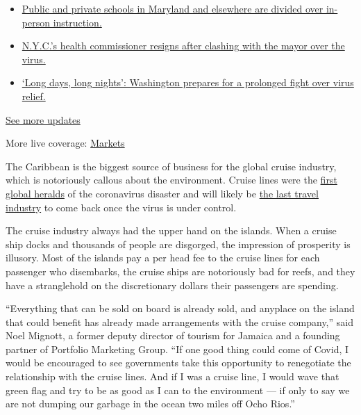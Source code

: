 \begin{itemize}
\tightlist
\item
  \href{https://www.nytimes.com/2020/08/04/world/coronavirus-cases.html?action=click\&pgtype=Article\&state=default\&region=MAIN_CONTENT_1\&context=storylines_live_updates\#link-4825b93}{Public
  and private schools in Maryland and elsewhere are divided over
  in-person instruction.}
\item
  \href{https://www.nytimes.com/2020/08/04/world/coronavirus-cases.html?action=click\&pgtype=Article\&state=default\&region=MAIN_CONTENT_1\&context=storylines_live_updates\#link-4d1eafa8}{N.Y.C.'s
  health commissioner resigns after clashing with the mayor over the
  virus.}
\item
  \href{https://www.nytimes.com/2020/08/04/world/coronavirus-cases.html?action=click\&pgtype=Article\&state=default\&region=MAIN_CONTENT_1\&context=storylines_live_updates\#link-6b644638}{`Long
  days, long nights': Washington prepares for a prolonged fight over
  virus relief.}
\end{itemize}

\href{https://www.nytimes.com/2020/08/04/world/coronavirus-cases.html?action=click\&pgtype=Article\&state=default\&region=MAIN_CONTENT_1\&context=storylines_live_updates}{See
more updates}

More live coverage:
\href{https://www.nytimes.com/live/2020/08/04/business/stock-market-today-coronavirus?action=click\&pgtype=Article\&state=default\&region=MAIN_CONTENT_1\&context=storylines_live_updates}{Markets}

The Caribbean is the biggest source of business for the global cruise
industry, which is notoriously callous about the environment. Cruise
lines were the
\href{https://www.nytimes.com/2020/03/19/travel/coronavirus-cruise-costa-luminosa.html}{first
global heralds} of the coronavirus disaster and will likely be
\href{https://www.nytimes.com/2020/06/26/travel/coronavirus-cruises-reopening.html}{the
last travel industry} to come back once the virus is under control.

The cruise industry always had the upper hand on the islands. When a
cruise ship docks and thousands of people are disgorged, the impression
of prosperity is illusory. Most of the islands pay a per head fee to the
cruise lines for each passenger who disembarks, the cruise ships are
notoriously bad for reefs, and they have a stranglehold on the
discretionary dollars their passengers are spending.

``Everything that can be sold on board is already sold, and anyplace on
the island that could benefit has already made arrangements with the
cruise company,'' said Noel Mignott, a former deputy director of tourism
for Jamaica and a founding partner of Portfolio Marketing Group. ``If
one good thing could come of Covid, I would be encouraged to see
governments take this opportunity to renegotiate the relationship with
the cruise lines. And if I was a cruise line, I would wave that green
flag and try to be as good as I can to the environment --- if only to
say we are not dumping our garbage in the ocean two miles off Ocho
Rios.''

